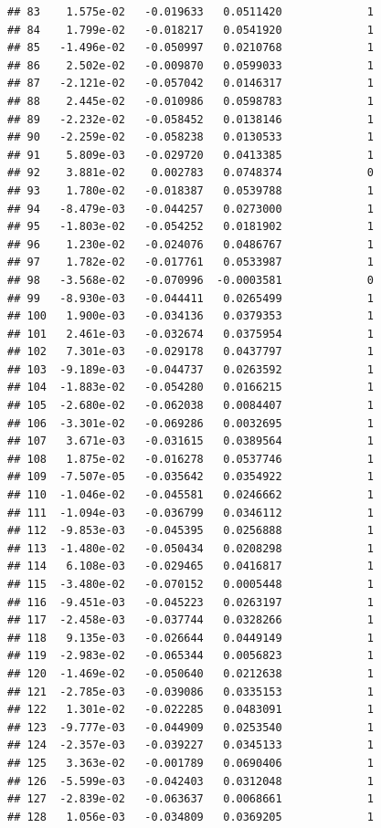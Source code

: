 \documentclass[12pt]{article}\usepackage[]{graphicx}\usepackage[]{xcolor}
\makeatletter
\newenvironment{kframe}{%
 \def\at@end@of@kframe{}%
 \ifinner\ifhmode%
  \def\at@end@of@kframe{\end{minipage}}%
  \begin{minipage}{\columnwidth}%
 \fi\fi%
 \def\FrameCommand##1{\hskip\@totalleftmargin \hskip-\fboxsep
 \colorbox{shadecolor}{##1}\hskip-\fboxsep
     \hskip-\linewidth \hskip-\@totalleftmargin \hskip\columnwidth}%
 \MakeFramed {\advance\hsize-\width
   \@totalleftmargin\z@ \linewidth\hsize
   \@setminipage}}%
 {\par\unskip\endMakeFramed%
 \at@end@of@kframe}
\newenvironment{knitrout}{}{} %
\makeatother
\begin{document}
\begin{knitrout}
\begin{kframe}
\begin{verbatim}
## 83    1.575e-02   -0.019633   0.0511420             1
## 84    1.799e-02   -0.018217   0.0541920             1
## 85   -1.496e-02   -0.050997   0.0210768             1
## 86    2.502e-02   -0.009870   0.0599033             1
## 87   -2.121e-02   -0.057042   0.0146317             1
## 88    2.445e-02   -0.010986   0.0598783             1
## 89   -2.232e-02   -0.058452   0.0138146             1
## 90   -2.259e-02   -0.058238   0.0130533             1
## 91    5.809e-03   -0.029720   0.0413385             1
## 92    3.881e-02    0.002783   0.0748374             0
## 93    1.780e-02   -0.018387   0.0539788             1
## 94   -8.479e-03   -0.044257   0.0273000             1
## 95   -1.803e-02   -0.054252   0.0181902             1
## 96    1.230e-02   -0.024076   0.0486767             1
## 97    1.782e-02   -0.017761   0.0533987             1
## 98   -3.568e-02   -0.070996  -0.0003581             0
## 99   -8.930e-03   -0.044411   0.0265499             1
## 100   1.900e-03   -0.034136   0.0379353             1
## 101   2.461e-03   -0.032674   0.0375954             1
## 102   7.301e-03   -0.029178   0.0437797             1
## 103  -9.189e-03   -0.044737   0.0263592             1
## 104  -1.883e-02   -0.054280   0.0166215             1
## 105  -2.680e-02   -0.062038   0.0084407             1
## 106  -3.301e-02   -0.069286   0.0032695             1
## 107   3.671e-03   -0.031615   0.0389564             1
## 108   1.875e-02   -0.016278   0.0537746             1
## 109  -7.507e-05   -0.035642   0.0354922             1
## 110  -1.046e-02   -0.045581   0.0246662             1
## 111  -1.094e-03   -0.036799   0.0346112             1
## 112  -9.853e-03   -0.045395   0.0256888             1
## 113  -1.480e-02   -0.050434   0.0208298             1
## 114   6.108e-03   -0.029465   0.0416817             1
## 115  -3.480e-02   -0.070152   0.0005448             1
## 116  -9.451e-03   -0.045223   0.0263197             1
## 117  -2.458e-03   -0.037744   0.0328266             1
## 118   9.135e-03   -0.026644   0.0449149             1
## 119  -2.983e-02   -0.065344   0.0056823             1
## 120  -1.469e-02   -0.050640   0.0212638             1
## 121  -2.785e-03   -0.039086   0.0335153             1
## 122   1.301e-02   -0.022285   0.0483091             1
## 123  -9.777e-03   -0.044909   0.0253540             1
## 124  -2.357e-03   -0.039227   0.0345133             1
## 125   3.363e-02   -0.001789   0.0690406             1
## 126  -5.599e-03   -0.042403   0.0312048             1
## 127  -2.839e-02   -0.063637   0.0068661             1
## 128   1.056e-03   -0.034809   0.0369205             1

\end{verbatim}
\end{kframe}
\end{knitrout}
\end{document}
